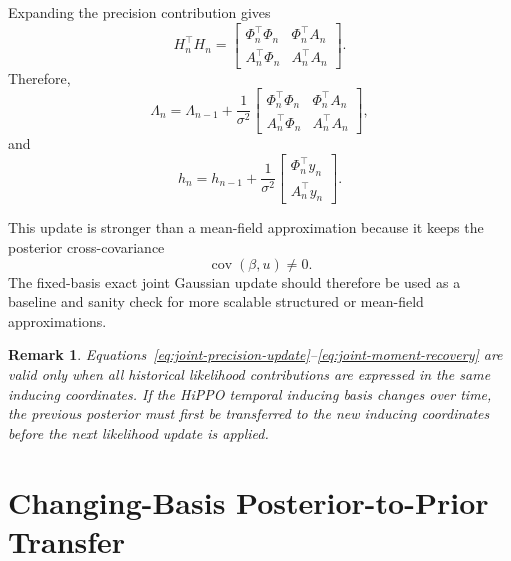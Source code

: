 \documentclass[12pt]{article}
\newtheorem{remark}{Remark}
\newcommand{\cov}{\operatorname{cov}}
\begin{document}
Expanding the precision contribution gives
\begin{equation}
H_n^\top H_n
=
\begin{bmatrix}
\Phi_n^\top\Phi_n
&
\Phi_n^\top A_n
\\
A_n^\top\Phi_n
&
A_n^\top A_n
\end{bmatrix}.
\label{eq:joint-precision-blocks}
\end{equation}
Therefore,
\begin{equation}
\Lambda_n
=
\Lambda_{n-1}
+
\frac{1}{\sigma^2}
\begin{bmatrix}
\Phi_n^\top\Phi_n
&
\Phi_n^\top A_n
\\
A_n^\top\Phi_n
&
A_n^\top A_n
\end{bmatrix},
\end{equation}
and
\begin{equation}
h_n
=
h_{n-1}
+
\frac{1}{\sigma^2}
\begin{bmatrix}
\Phi_n^\top y_n\\
A_n^\top y_n
\end{bmatrix}.
\end{equation}

This update is stronger than a mean-field approximation because it keeps the posterior
cross-covariance
\begin{equation}
\cov(\beta,u)\neq 0.
\end{equation}
The fixed-basis exact joint Gaussian update should therefore be used as a baseline and
sanity check for more scalable structured or mean-field approximations.

\begin{remark}
Equations~\eqref{eq:joint-precision-update}--\eqref{eq:joint-moment-recovery} are valid
only when all historical likelihood contributions are expressed in the same inducing
coordinates. If the HiPPO temporal inducing basis changes over time, the previous
posterior must first be transferred to the new inducing coordinates before the next
likelihood update is applied.
\end{remark}

\section{Changing-Basis Posterior-to-Prior Transfer}
\label{sec:changing_basis_transfer}
\end{document}
